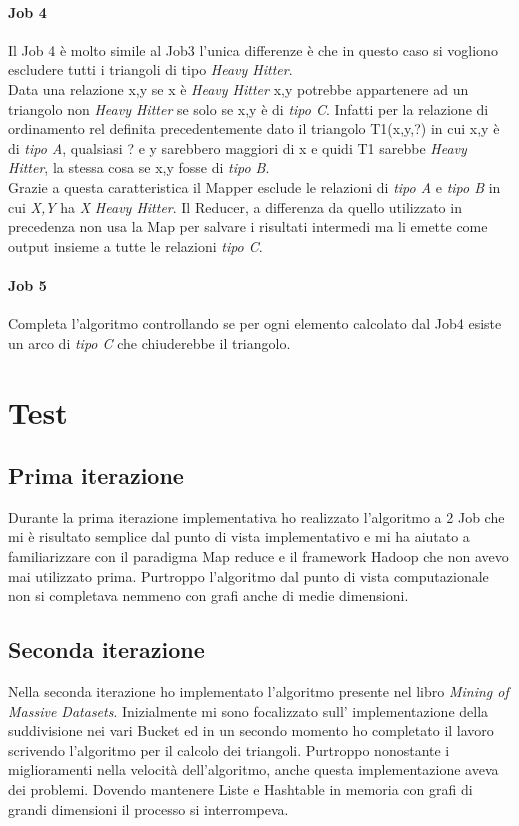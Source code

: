 \documentclass[paper=a4, fontsize=11pt]{scrartcl}	%
\numberwithin{equation}{section}															%
\numberwithin{figure}{section}																%
\numberwithin{table}{section}																%
\begin{document}
\paragraph{Job 4}
Il Job 4 è molto simile al Job3 l'unica differenze è che in questo caso si vogliono escludere tutti i triangoli di tipo \textit{Heavy Hitter}.\\
Data una relazione x,y se x è \textit{Heavy Hitter} x,y potrebbe appartenere ad un triangolo non \textit{Heavy Hitter} se solo se x,y è di \textit{tipo C}. Infatti per la relazione di ordinamento rel definita precedentemente dato il triangolo T1(x,y,?) in cui x,y è di \textit{tipo A}, qualsiasi ? e y sarebbero maggiori di x e quidi T1 sarebbe \textit{Heavy Hitter}, la stessa cosa se x,y fosse di \textit{tipo B}.\\
Grazie a questa caratteristica il Mapper esclude le relazioni di \textit{tipo A} e \textit{tipo B} in cui \textit{X,Y} ha \textit{X} \textit{Heavy Hitter}.
Il Reducer, a differenza da quello utilizzato in precedenza non usa la Map per salvare i risultati intermedi ma li emette come output insieme a tutte le relazioni \textit{tipo C}.
\paragraph{Job 5}
Completa l'algoritmo controllando se per ogni elemento calcolato dal Job4 esiste un arco di \textit{tipo C} che chiuderebbe il triangolo.
\section{Test}
\subsection{Prima iterazione} 
Durante la prima iterazione implementativa ho realizzato l'algoritmo a 2 Job che mi è risultato semplice dal punto di vista implementativo e mi ha aiutato a familiarizzare con il paradigma Map reduce e il framework Hadoop che non avevo mai utilizzato prima. Purtroppo l'algoritmo dal punto di vista computazionale non si completava nemmeno con grafi anche di medie dimensioni.
\subsection{Seconda iterazione} 
Nella seconda iterazione ho implementato l'algoritmo presente nel libro \textit{Mining of Massive Datasets}.
Inizialmente mi sono focalizzato sull' implementazione della suddivisione nei vari Bucket ed in un secondo momento ho completato il lavoro scrivendo l'algoritmo per il calcolo dei triangoli. Purtroppo nonostante i miglioramenti nella velocità dell'algoritmo, anche questa implementazione aveva dei problemi. Dovendo mantenere Liste e Hashtable in memoria con grafi di grandi dimensioni il processo si interrompeva.
\end{document}

